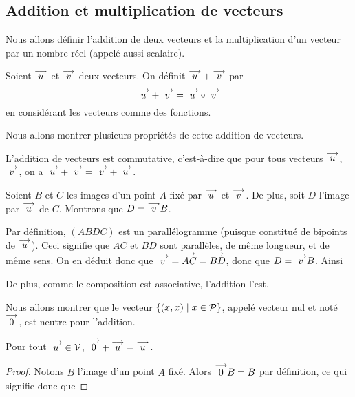 \subsection{Addition et multiplication de vecteurs}

Nous allons définir l'addition de deux vecteurs et la multiplication d'un vecteur par un nombre réel (appelé aussi scalaire).

\begin{defi}
    Soient $\overset{\longrightarrow}{u}$ et $\overset{\longrightarrow}{v}$ deux vecteurs. On définit $\overset{\longrightarrow}{u} + \overset{\longrightarrow}{v}$ par $$\overset{\longrightarrow}{u} + \overset{\longrightarrow}{v} = \overset{\longrightarrow}{u} \circ \overset{\longrightarrow}{v}$$ en considérant les vecteurs comme des fonctions.
\end{defi}

Nous allons montrer plusieurs propriétés de cette addition de vecteurs.

\begin{prop}
    L'addition de vecteurs est commutative, c'est-à-dire que pour tous vecteurs $\overset{\longrightarrow}{u}$, $\overset{\longrightarrow}{v}$, on a $\overset{\longrightarrow}{u} + \overset{\longrightarrow}{v} = \overset{\longrightarrow}{v} + \overset{\longrightarrow}{u}$.
\end{prop}
\begin{prop}
    Soient $B$ et $C$ les images d'un point $A$ fixé par $\overset{\longrightarrow}{u}$ et $\overset{\longrightarrow}{v}$. De plus, soit $D$ l'image par $\overset{\longrightarrow}{u}$ de $C$. Montrons que $D=\overset{\longrightarrow}{v} B$.
    
    Par définition, $(ABDC)$ est un parallélogramme (puisque constitué de bipoints de $\overset{\longrightarrow}{u}$). Ceci signifie que $AC$ et $BD$ sont parallèles, de même longueur, et de même sens. On en déduit donc que $\overset{\longrightarrow}{v}=\overset{\longrightarrow}{AC}=\overset{\longrightarrow}{BD}$, donc que $D=\overset{\longrightarrow}{v} B$. Ainsi 
\end{prop}

De plus, comme le composition est associative, l'addition l'est.

Nous allons montrer que le vecteur $\{(x,x)\;|\;x\in\mathcal P\}$, appelé vecteur nul et noté $\overset{\longrightarrow}{0}$, est neutre pour l'addition.

\begin{prop}
    Pour tout $\overset{\longrightarrow}{u}\in\mathcal V$, $\overset{\longrightarrow}{0} + \overset{\longrightarrow}{u}=\overset{\longrightarrow}{u}$.
\end{prop}
\begin{proof}
    Notons $B$ l'image d'un point $A$ fixé. Alors $\overset{\longrightarrow}{0} B = B$ par définition, ce qui signifie donc que 
\end{proof}

